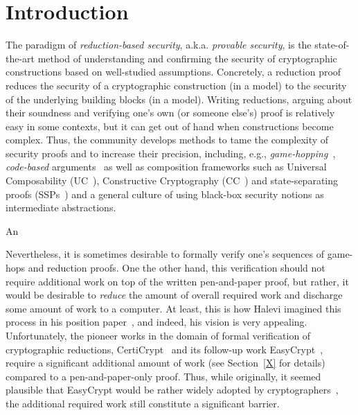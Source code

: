 \section{Introduction}
The paradigm of \emph{reduction-based security}, a.k.a. \emph{provable security}, is the state-of-the-art method of understanding and confirming the security of cryptographic constructions based on well-studied assumptions. Concretely, a reduction proof reduces the security of a cryptographic construction (in a model) to the security of the underlying building blocks (in a model). Writing reductions, arguing about their soundness and verifying one's own (or someone else's) proof is relatively easy in some contexts, but it can get out of hand when constructions become complex. Thus, the community develops methods to tame the complexity of security proofs and to increase their precision, including, e.g., \emph{game-hopping}~\cite{EPRINT:Shoup04}, \emph{code-based} arguments~\cite{EC:BelRog06} as well as composition frameworks such as Universal Composability (UC~\cite{FOCS:Canetti01}), Constructive Cryptography (CC~\cite{FC:Maurer10}) and state-separating proofs (SSPs~\cite{X}) and a general culture of using black-box security notions as intermediate abstractions.

An

Nevertheless, it is sometimes desirable to formally verify one's sequences of game-hops and reduction proofs. One the other hand, this verification should not require additional work on top of the written pen-and-paper proof, but rather, it would be desirable to \emph{reduce} the amount of overall required work and discharge some amount of work to a computer. At least, this is how Halevi imagined this process in his position paper~\cite{X}, and indeed, his vision is very appealing. Unfortunately, the pioneer works in the domain of formal verification of cryptographic reductions, CertiCrypt~\cite{X} and its follow-up work EasyCrypt~\cite{X}, require a significant additional amount of work (see Section~\ref{X} for details) compared to a pen-and-paper-only proof. Thus, while originally, it seemed plausible that EasyCrypt would be rather widely adopted by cryptographers~\cite[page 1]{X}, the additional required work still constitute a significant barrier.

